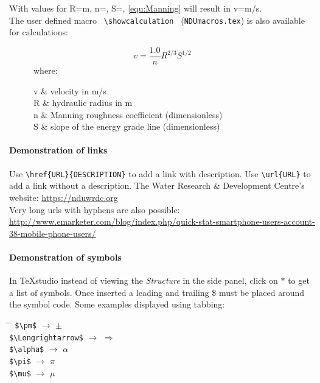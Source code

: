 With values for R=\varR m, n=\varN, S=\varS{}, \eqref{equ:Manning} will result in v=\varResult m/s.\\
The user defined macro \verb! \showcalculation ! (\texttt{NDUmacros.tex}) is also available for calculations:

\begin{figure}[h!] %
	\begin{equation}\label{equ:Manning}
		v = \frac{1.0}{n} R^{2/3} S^{1/2}	
	\end{equation}
	where:
	\begin{conditions}
		v	&	velocity in m/s\\
		R	&	hydraulic radius in m\\
		n	&	Manning roughness coefficient (dimensionless)\\   
		S	&	slope of the energy grade line (dimensionless)
	\end{conditions}
\end{figure}

\paragraph{Demonstration of links}
Use \verb!\href{URL}{DESCRIPTION}! to add a link with description.
Use \verb!\url{URL}! to add a link without a description.
The Water Research \& Development Centre's website: \url{https://nduwrdc.org}\\
Very long urls with hyphens are also possible:\\ \url{http://www.emarketer.com/blog/index.php/quick-stat-smartphone-users-account-38-mobile-phone-users/}


\paragraph{Demonstration of symbols}
In TeXstudio instead of viewing the \textit{Structure} in the side panel, click on $\ast$ to get a list of symbols. Once inserted a leading and trailing \$ must be placed around the symbol code. Some examples displayed using tabbing:
\begin{tabbing}
	\hspace{2in}     			\= \hspace{0.40in}  \= \hspace{1in}    		\kill
	\verb!$\pm$! 				\> $\rightarrow$ 	\> $\pm$ 				\\
	\verb!$\Longrightarrow$! 	\> $\rightarrow$ 	\> $\Longrightarrow$ 	\\
	\verb!$\alpha$! 			\> $\rightarrow$ 	\> $\alpha$ 			\\
	\verb!$\pi$! 				\> $\rightarrow$ 	\> $\pi$ 				\\
	\verb!$\mu$! 				\> $\rightarrow$ 	\> $\mu$	 			\\
\end{tabbing}


